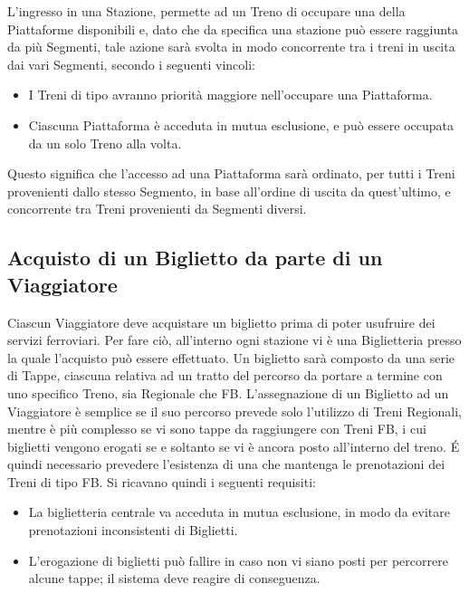 	L'ingresso in una Stazione, permette ad un Treno di occupare una della Piattaforme disponibili e, dato che da specifica una stazione può essere raggiunta da più Segmenti, tale azione sarà svolta in modo concorrente tra i treni in uscita dai vari Segmenti, secondo i seguenti vincoli:
		\begin{itemize}
			\item I Treni di tipo  avranno priorità maggiore nell'occupare una Piattaforma.
			\item Ciascuna Piattaforma è acceduta in mutua esclusione, e può essere occupata da un solo Treno alla volta.  
		\end{itemize}

	Questo significa che l'accesso ad una Piattaforma sarà ordinato, per tutti i Treni provenienti dallo stesso Segmento, in base all'ordine di uscita da quest'ultimo, e concorrente tra Treni provenienti da Segmenti diversi. 

	\subsection{Acquisto di un Biglietto da parte di un Viaggiatore}

	Ciascun Viaggiatore deve acquistare un biglietto prima di poter usufruire dei servizi ferroviari. Per fare ciò, all'interno ogni stazione vi è una Biglietteria presso la quale l'acquisto può essere effettuato. Un biglietto sarà composto da una serie di Tappe, ciascuna relativa ad un tratto del percorso da portare a termine con uno specifico Treno, sia Regionale che FB. 
	L'assegnazione di un Biglietto ad un Viaggiatore è semplice se il suo percorso prevede solo l'utilizzo di Treni Regionali, mentre è più complesso se vi sono tappe da raggiungere con Treni FB, i cui biglietti vengono erogati se e soltanto se vi è ancora posto all'interno del treno.
	\'E quindi necessario prevedere l'esistenza di una  che mantenga le prenotazioni dei Treni di tipo FB. Si ricavano quindi i seguenti requisiti:
		\begin{itemize}
			\item La biglietteria centrale va acceduta in mutua esclusione, in modo da evitare prenotazioni inconsistenti di Biglietti.
			\item L'erogazione di biglietti può fallire in caso non vi siano posti per percorrere alcune tappe; il sistema deve reagire di conseguenza.
		\end{itemize}
